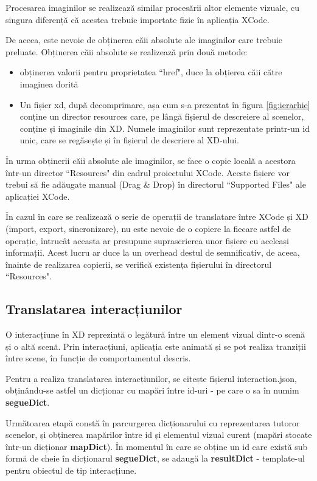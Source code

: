 Procesarea imaginilor se realizează similar procesării altor elemente vizuale, cu singura diferență că acestea trebuie importate fizic în aplicația XCode.

De aceea, este nevoie de obținerea căii absolute ale imaginilor care trebuie preluate. 
Obținerea căii absolute se realizează prin două metode:

\begin{itemize}  
\item obținerea valorii pentru proprietatea ``href", duce la obțierea căii către imaginea dorită
\item Un fișier xd, după decomprimare, așa cum s-a prezentat în figura \ref{fig:ierarhie} conține un director resources care, pe lângă fișierul de descreiere al scenelor, conține și imaginile din XD. Numele imaginilor sunt reprezentate printr-un id unic, care se regăsește și în fișierul de descriere al XD-ului.
\end{itemize}

În urma obținerii căii absolute ale imaginilor, se face o copie locală a acestora într-un director ``Resources" din cadrul proiectului XCode. Aceste fișiere vor trebui să fie adăugate manual (Drag & Drop) în directorul ``Supported Files" ale aplicației XCode.

În cazul în care se realizează o serie de operații de translatare între XCode și XD (import, export, sincronizare), nu este nevoie de o copiere la fiecare astfel de operație, întrucât aceasta ar presupune suprascrierea unor fișiere cu aceleași informații. Acest lucru ar duce la un overhead destul de semnificativ, de aceea, înainte de realizarea copierii, se verifică existența fișierului în directorul ``Resources".

\subsection{Translatarea interacțiunilor}

O interacțiune în XD reprezintă o legătură între un element vizual dintr-o scenă și o altă scenă. Prin interacțiuni, aplicația este animată și se pot realiza tranziții între scene, în funcție de comportamentul descris. 

Pentru a realiza translatarea interacțiunilor, se citește fișierul interaction.json, obținându-se astfel un dicționar cu mapări între id-uri - pe care o sa în numim \textbf{segueDict}. 

Următoarea etapă constă în parcurgerea dicționarului cu reprezentarea tutoror scenelor, și obținerea mapărilor între id și elementul vizual curent (mapări stocate într-un dicționar \textbf{mapDict}). În momentul în care se obține un id care există sub formă de cheie în dicționarul \textbf{segueDict}, se adaugă la \textbf{resultDict} - template-ul pentru obiectul de tip interacțiune. 

